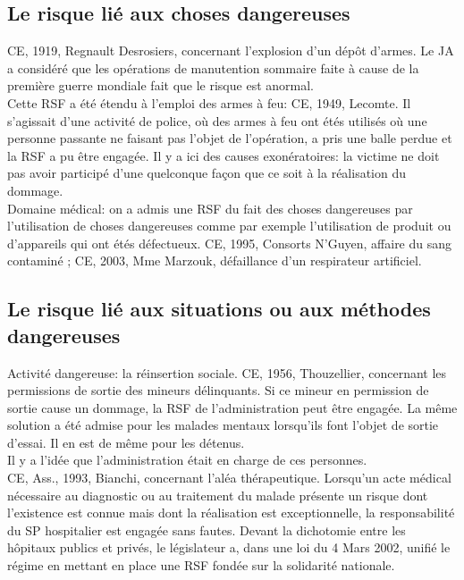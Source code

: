 \documentclass[10pt, a4paper, openany]{book}
\begin{document}
\subsection{Le risque lié aux choses dangereuses}

CE, 1919, Regnault Desrosiers, concernant l'explosion d'un dépôt d'armes. Le JA a considéré que les opérations de manutention sommaire faite à cause de la première guerre mondiale fait que le risque est anormal. \\
Cette RSF a été étendu à l'emploi des armes à feu: CE, 1949, Lecomte. Il s'agissait d'une activité de police, où des armes à feu ont étés utilisés où une personne passante ne faisant pas l'objet de l'opération, a pris une balle perdue et la RSF a pu être engagée. Il y a ici des causes exonératoires: la victime ne doit pas avoir participé d'une quelconque façon que ce soit à la réalisation du dommage. \\
Domaine médical: on a admis une RSF du fait des choses dangereuses par l'utilisation de choses dangereuses comme par exemple l'utilisation de produit ou d'appareils qui ont étés défectueux. CE, 1995, Consorts N'Guyen, affaire du sang contaminé ; CE, 2003, Mme Marzouk, défaillance d'un respirateur artificiel. 

\subsection{Le risque lié aux situations ou aux méthodes dangereuses}

Activité dangereuse: la réinsertion sociale. CE, 1956, Thouzellier, concernant les permissions de sortie des mineurs délinquants. Si ce mineur en permission de sortie cause un dommage, la RSF de l'administration peut être engagée. La même solution a été admise pour les malades mentaux lorsqu'ils font l'objet de sortie d'essai. Il en est de même pour les détenus. \\
Il y a l'idée que l'administration était en charge de ces personnes. \\
CE, Ass., 1993, Bianchi, concernant l'aléa thérapeutique. Lorsqu'un acte médical nécessaire au diagnostic ou au traitement du malade présente un risque dont l'existence est connue mais dont la réalisation est exceptionnelle, la responsabilité du SP hospitalier est engagée sans fautes. Devant la dichotomie entre les hôpitaux publics et privés, le législateur a, dans une loi du 4 Mars 2002, unifié le régime en mettant en place une RSF fondée sur la solidarité nationale. 
\end{document}
